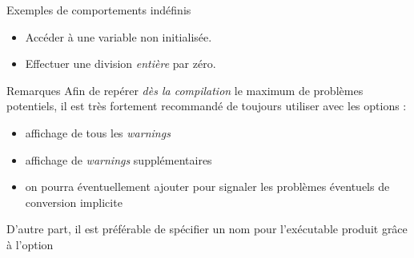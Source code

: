 \documentclass[10pt]{beamer}
\begin{document}
\begin{frame}{\Ctitle}{\stitle}
	\begin{exampleblock}{Exemples de comportements indéfinis}
		\begin{itemize}
			\item<1-> Accéder à une variable non initialisée.
			\item<2-> Effectuer une division \textit{entière} par zéro.
		\end{itemize}
	\end{exampleblock}
\end{frame}


\begin{frame}{\Ctitle}{\stitle}
	\begin{block}{Remarques}
		Afin de repérer \textit{dès la compilation} le maximum de problèmes potentiels, il est \textcolor{BrickRed}{très fortement recommandé} de toujours utiliser  avec les options :
		\begin{itemize}
			\item<2-> affichage de tous les \textit{warnings}
			\item<3-> affichage de \textit{warnings} supplémentaires
			\item<4-> on pourra éventuellement ajouter  pour signaler les problèmes éventuels de conversion implicite
		\end{itemize}
		 D'autre part, il est préférable de spécifier un nom pour l'exécutable produit grâce à l'option 
	\end{block}
\end{frame}
\end{document}
